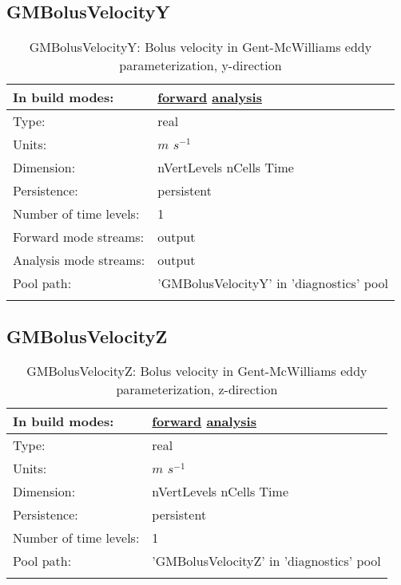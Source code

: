 \subsection[GMBolusVelocityY]{GMBolusVelocityY}
\label{subsec:var_sec_diagnostics_GMBolusVelocityY}
\begin{center}
\begin{longtable}{| p{2.0in} | p{4.0in} |}
        \hline 
        In build modes: & \hyperref[subsec:forward_var_tab_diagnostics]{forward} \hyperref[subsec:analysis_var_tab_diagnostics]{analysis} \\
        \hline 
        Type: & real \\
        \hline 
        Units: & $m$ $s^{-1}$ \\
        \hline 
        Dimension: & nVertLevels nCells Time \\
        \hline 
        Persistence: & persistent \\
        \hline 
        Number of time levels: & 1 \\
        \hline 
		 Forward mode streams: &  output \\
        \hline 
		 Analysis mode streams: &  output \\
        \hline 
            Pool path: & 'GMBolusVelocityY' in 'diagnostics' pool
 \\
		 \hline 
    \caption{GMBolusVelocityY: Bolus velocity in Gent-McWilliams eddy parameterization, y-direction}
\end{longtable}
\end{center}
\subsection[GMBolusVelocityZ]{GMBolusVelocityZ}
\label{subsec:var_sec_diagnostics_GMBolusVelocityZ}
\begin{center}
\begin{longtable}{| p{2.0in} | p{4.0in} |}
        \hline 
        In build modes: & \hyperref[subsec:forward_var_tab_diagnostics]{forward} \hyperref[subsec:analysis_var_tab_diagnostics]{analysis} \\
        \hline 
        Type: & real \\
        \hline 
        Units: & $m$ $s^{-1}$ \\
        \hline 
        Dimension: & nVertLevels nCells Time \\
        \hline 
        Persistence: & persistent \\
        \hline 
        Number of time levels: & 1 \\
        \hline 
            Pool path: & 'GMBolusVelocityZ' in 'diagnostics' pool
 \\
		 \hline 
    \caption{GMBolusVelocityZ: Bolus velocity in Gent-McWilliams eddy parameterization, z-direction}
\end{longtable}
\end{center}
